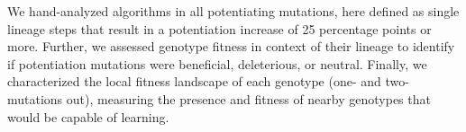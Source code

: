 We hand-analyzed algorithms in all potentiating mutations, here defined as single lineage steps that result in a potentiation increase of 25 percentage points or more.
Further, we assessed genotype fitness in context of their lineage to identify if potentiation mutations were beneficial, deleterious, or neutral. 
Finally, %
we characterized the local fitness landscape of each genotype (one- and two-mutations out), measuring the presence and fitness of nearby genotypes that would be capable of learning. 




